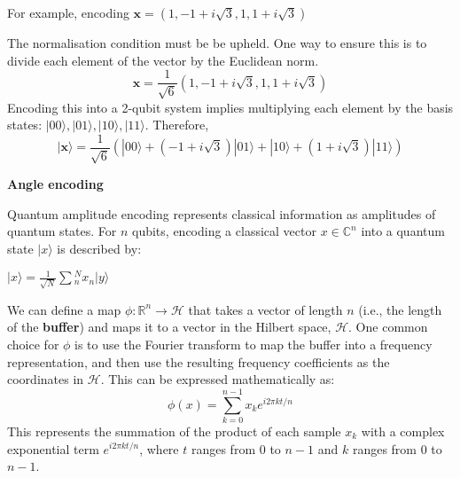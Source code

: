 For example, encoding $\mathbf{x} = (1, -1+i\sqrt{3}, 1, 1+i\sqrt{3})$

The normalisation condition must be be upheld.
One way to ensure this is to divide each element of the vector by the Euclidean norm.
\begin{equation}
    \displaystyle{\mathbf{x} = \frac{1}{\sqrt{6}}(1, -1+i\sqrt{3}, 1, 1+i\sqrt{3})}
\end{equation}
Encoding this into a 2-qubit system implies multiplying each element by the basis states: $|00\rangle, |01\rangle, |10\rangle, |11\rangle$.
Therefore, 
\begin{equation}
    \displaystyle{
        | \mathbf{x} \rangle =
        \frac{1}{\sqrt{6}}
        (
            |00\rangle +
            (-1 + i\sqrt{3}) |01\rangle +
            |10\rangle +
            (1 + i\sqrt{3}) |11\rangle
        )
    }
\end{equation}

\textbf{Angle encoding}

Quantum amplitude encoding represents classical information as amplitudes of quantum states.
For $n$ qubits, encoding a classical vector $x \in \mathbb{C}^{n}$ into a quantum state $\vert x \rangle$ is described by:

$|x\rangle = \frac{1}{\sqrt{N}} \sum{_n^N}  x_n \vert y \rangle$


We can define a map $\phi: \mathbb{R}^n \rightarrow \mathcal{H}$ that takes a vector of length $n$ (i.e., the length of the \textbf{buffer}) and maps it to a vector in the Hilbert space, $\mathcal{H}$.
One common choice for $\phi$ is to use the Fourier transform to map the buffer into a frequency representation, and then use the resulting frequency coefficients as the coordinates in $\mathcal{H}$. This can be expressed mathematically as:
\begin{equation}
\phi(x) = \sum_{k=0}^{n-1} x_k e^{i2\pi k t / n}
\end{equation}
This represents the summation of the product of each sample $x_k$ with a complex exponential term $e^{i2\pi k t / n}$, where $t$ ranges from 0 to $n-1$ and $k$ ranges from 0 to $n-1$.

